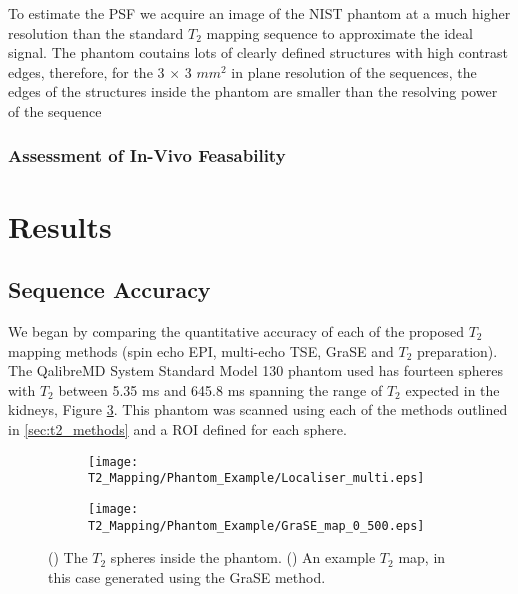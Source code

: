 To estimate the \ac{PSF} we acquire an image of the \ac{NIST} phantom at a much higher resolution than the standard $T_2$ mapping sequence to approximate the ideal signal. The phantom coutains lots of clearly defined structures with high contrast edges, therefore, for the 3 $\times$ 3 $mm^2$ in plane resolution of the sequences, the edges of the structures inside the phantom are smaller than the resolving power of the sequence

\subsubsection{Assessment of In-Vivo Feasability}

\section{Results}

\subsection{Sequence Accuracy}

We began by comparing the quantitative accuracy of each of the proposed $T_2$ mapping methods (spin echo \ac{EPI}, multi-echo \ac{TSE}, \ac{GraSE} and $T_2$ preparation).  The QalibreMD System Standard Model 130 phantom used has fourteen spheres with $T_2$ between 5.35 ms and 645.8 ms spanning the range of $T_2$ expected in the kidneys, Figure \ref{fig:t2_phantom_eg}. This phantom was scanned using each of the methods outlined in \ref{sec:t2_methods} and a \ac{ROI} defined for each sphere. 

\begin{figure}[H]
	\centering
	\begin{subfigure}[c]{0.47\textwidth}
		\centering
		\texttt{[image: T2\_Mapping/Phantom\_Example/Localiser\_multi.eps]}
		\caption{}
		\label{fig:t2_phantom_loc}
	\end{subfigure}
	\hfill
	\begin{subfigure}[c]{0.47\textwidth}
		\centering
		\texttt{[image: T2\_Mapping/Phantom\_Example/GraSE\_map\_0\_500.eps]}
		\caption{}
		\label{fig:t2_phantom_map}
	\end{subfigure}
	\caption{() The $T_2$ spheres inside the phantom. () An example $T_2$ map, in this case generated using the \ac{GraSE} method.}
	\label{fig:t2_phantom_eg}
\end{figure}


